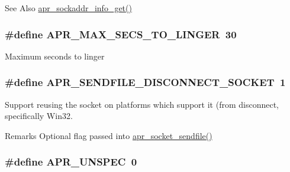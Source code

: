 \begin{DoxySeeAlso}{See Also}
\hyperlink{group__apr__network__io_gaa2f399ca2b60b35c0abf7630298c6c9f}{apr\-\_\-sockaddr\-\_\-info\-\_\-get()} 
\end{DoxySeeAlso}
\hypertarget{group__apr__network__io_ga8311c84f6946742188a6b9a45e92ea8e}{
\subsubsection[{A\-P\-R\-\_\-\-M\-A\-X\-\_\-\-S\-E\-C\-S\-\_\-\-T\-O\-\_\-\-L\-I\-N\-G\-E\-R}]{\setlength{\rightskip}{0pt plus 5cm}\#define A\-P\-R\-\_\-\-M\-A\-X\-\_\-\-S\-E\-C\-S\-\_\-\-T\-O\-\_\-\-L\-I\-N\-G\-E\-R~30}}\label{group__apr__network__io_ga8311c84f6946742188a6b9a45e92ea8e}
Maximum seconds to linger \hypertarget{group__apr__network__io_gaca378d0e24b1588e3fdb143e4ea9090d}{
\subsubsection[{A\-P\-R\-\_\-\-S\-E\-N\-D\-F\-I\-L\-E\-\_\-\-D\-I\-S\-C\-O\-N\-N\-E\-C\-T\-\_\-\-S\-O\-C\-K\-E\-T}]{\setlength{\rightskip}{0pt plus 5cm}\#define A\-P\-R\-\_\-\-S\-E\-N\-D\-F\-I\-L\-E\-\_\-\-D\-I\-S\-C\-O\-N\-N\-E\-C\-T\-\_\-\-S\-O\-C\-K\-E\-T~1}}\label{group__apr__network__io_gaca378d0e24b1588e3fdb143e4ea9090d}
Support reusing the socket on platforms which support it (from disconnect, specifically Win32. \begin{DoxyRemark}{Remarks}
Optional flag passed into \hyperlink{group__apr__network__io_ga3d93e6212c4c27f2390b0057f8f4a8be}{apr\-\_\-socket\-\_\-sendfile()} 
\end{DoxyRemark}
\hypertarget{group__apr__network__io_gaa7a33b17a7d0820b09ef489bd3328f85}{
\subsubsection[{A\-P\-R\-\_\-\-U\-N\-S\-P\-E\-C}]{\setlength{\rightskip}{0pt plus 5cm}\#define A\-P\-R\-\_\-\-U\-N\-S\-P\-E\-C~0}}\label{group__apr__network__io_gaa7a33b17a7d0820b09ef489bd3328f85}
